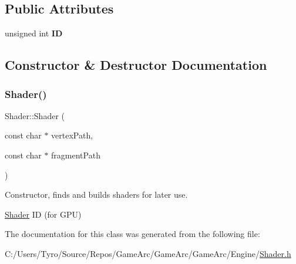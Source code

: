 \subsection*{Public Attributes}
\begin{DoxyCompactItemize}
\item 
\mbox{\label{class_shader_a142a08b6fbdfc982d82ca10ee0b0f38d}} 
unsigned int {\bfseries ID}
\end{DoxyCompactItemize}


\subsection{Constructor \& Destructor Documentation}
\mbox{\label{class_shader_a3e135bbf914b087a939114d79c10d283}} 
\subsubsection{\texorpdfstring{Shader()}{Shader()}}
{\footnotesize\ttfamily Shader\+::\+Shader (\begin{DoxyParamCaption}\item[{const char $\ast$}]{vertex\+Path,  }\item[{const char $\ast$}]{fragment\+Path }\end{DoxyParamCaption})\hspace{0.3cm}{\ttfamily [inline]}}



Constructor, finds and builds shaders for later use. 

\mbox{\hyperlink{class_shader}{Shader}} ID (for G\+PU) 

The documentation for this class was generated from the following file\+:\begin{DoxyCompactItemize}
\item 
C\+:/\+Users/\+Tyro/\+Source/\+Repos/\+Game\+Arc/\+Game\+Arc/\+Game\+Arc/\+Engine/\mbox{\hyperlink{_shader_8h}{Shader.\+h}}\end{DoxyCompactItemize}
